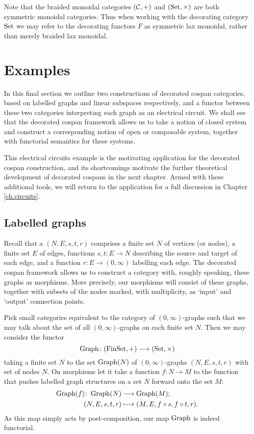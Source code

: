 Note that the braided monoidal categories $(\mathcal C,+)$ and $(\mathrm{Set},\times)$ are
both symmetric monoidal categories. Thus when working with the decorating
category $\mathrm{Set}$ we may refer to the decorating functors $F$ as symmetric lax
monoidal, rather than merely braided lax monoidal.

\section{Examples} \label{sec:ex}
In this final section we outline two constructions of decorated cospan
categories, based on labelled graphs and linear subspaces respectively, and a
functor between these two categories interpreting each graph as an electrical
circuit. We shall see that the decorated cospan framework allows us to take a
notion of closed system and construct a corresponding notion of open or
composable system, together with functorial semantics for these systems.

This electrical circuits example is the motivating application for the
decorated cospan construction, and its shortcomings motivate the further
theoretical development of decorated cospans in the next chapter. Armed with
these additional tools, we will return to the application for a full discussion
in Chapter \ref{ch.circuits}.

\subsection{Labelled graphs}

Recall that a  $(N,E,s,t,r)$ comprises a finite set
$N$ of vertices (or nodes), a finite set $E$ of edges, functions $s,t\colon  E \to N$
describing the source and target of each edge, and a function $r\colon  E \to
(0,\infty)$ labelling each edge. The decorated cospan framework allows us to
construct a category with, roughly speaking, these graphs as morphisms. More
precisely, our morphisms will consist of these graphs, together with subsets of
the nodes marked, with multiplicity, as `input' and `output' connection points.

Pick small categories equivalent to the category of $(0,\infty)$-graphs such
that we may talk about the set of all $(0,\infty)$-graphs on each finite set
$N$.  Then we may consider the functor
\[
  \operatorname{Graph}\colon  (\mathrm{FinSet},+) \longrightarrow (\mathrm{Set},\times)
\]
taking a finite set $N$ to the set $\operatorname{Graph}(N)$ of $(0,\infty)$-graphs
$(N,E,s,t,r)$ with set of nodes $N$. On
morphisms let it take a function $f\colon N \to M$ to the function that pushes
labelled graph structures on a set $N$ forward onto the set $M$:
\begin{align*}
  \operatorname{Graph}(f)\colon  \operatorname{Graph}(N) &\longrightarrow
  \operatorname{Graph}(M); \\
  (N,E,s,t,r) &\longmapsto (M,E,f \circ s, f \circ t, r).
\end{align*}
As this map simply acts by post-composition, our map $\operatorname{Graph}$ is indeed
functorial.

